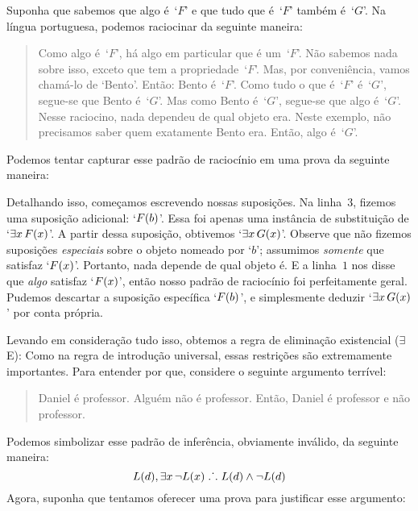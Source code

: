  Suponha que sabemos que algo é~`$F$' e que tudo que é~`$F$' também é~`$G$'. Na língua portuguesa, podemos raciocinar da seguinte maneira:
	\begin{quote}
		Como algo é~`$F$', há algo em particular que é um~`$F$'. Não sabemos nada sobre isso, exceto que tem a propriedade~`$F$'.  Mas, por conveniência, vamos chamá-lo de `Bento'. Então: Bento é~`$F$'. Como tudo o que é~`$F$' é~`$G$', segue-se que Bento é~`$G$'. Mas como Bento é~`$G$', segue-se que algo é~`$G$'. Nesse raciocino,  nada dependeu  de qual objeto era. Neste exemplo, não precisamos saber quem exatamente Bento era.   Então, algo é~`$G$'.
	\end{quote}
 Podemos tentar capturar esse padrão de raciocínio em uma prova da seguinte maneira:
\begin{fitchproof}
	\open
		 
	\close
\end{fitchproof}\noindent
Detalhando isso, começamos escrevendo nossas suposições. Na linha~$3$, fizemos uma suposição adicional: `$\mathord{F}(b)$'. Essa foi apenas uma instância de substituição de `$\exists x\,\mathord{F}(x)$'. A partir dessa suposição, obtivemos `$\exists x\,\mathord{G}(x)$'. Observe que não fizemos suposições \emph{especiais} sobre o objeto nomeado por `$b$'; assumimos \emph{somente} que satisfaz `$\mathord{F}(x)$'. Portanto, nada depende de qual objeto é. E a linha~$1$ nos disse que \emph{algo} satisfaz `$\mathord{F}(x)$', então nosso padrão de raciocínio foi perfeitamente geral. Pudemos descartar a suposição específica `$\mathord{F}(b)$', e simplesmente deduzir `$\exists x\,\mathord{G}(x)$' por conta própria.
 

Levando em consideração tudo isso, obtemos a regra de eliminação existencial ($\exists$E):
Como na regra de introdução universal, essas restrições são extremamente importantes. Para entender por que, considere o seguinte argumento terrível:
	\begin{quote}
		Daniel é professor. Alguém não é professor. Então, Daniel é professor e não professor.
	\end{quote}
Podemos simbolizar esse padrão de inferência, obviamente inválido, da seguinte maneira:
$$\mathord{L}(d), \exists x\, \neg\mathord{L}(x) \mathrel{\ldotp\dot{}\,\ldotp} \mathord{L}(d) \wedge \neg \mathord{L}(d)$$
Agora, suponha que tentamos oferecer uma prova para justificar esse argumento:

